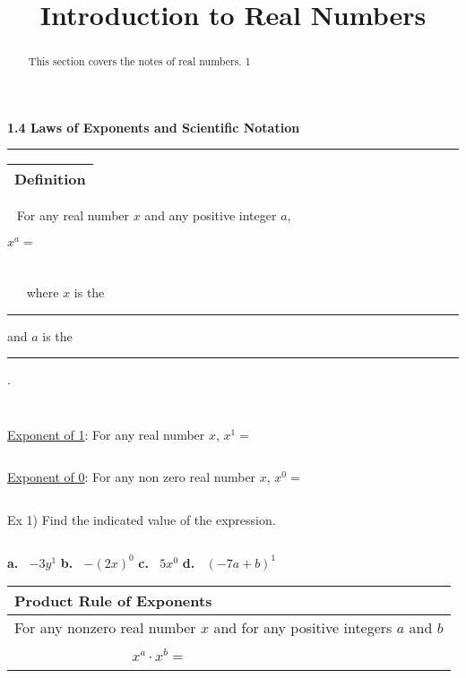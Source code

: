 \documentclass{ximera}
\title{Introduction to Real Numbers}
\begin{document}
\begin{abstract}
This section covers the notes of real numbers. 1
\end{abstract}

{\LARGE \textbf{1.4 Laws of Exponents and Scientific Notation}}

\noindent \rule{7.35in}{2pt}

\vspace{.2in}

\noindent \begin{tabular}{|c|} \hline Definition\\ \hline \end{tabular} $~~$ For any real number $x$ and any positive integer $a$,

\begin{center} {\LARGE $\displaystyle x^a=$} \end{center}

$~$

$~$

$~~~~~~~$where $x$ is the \rule{1in}{.5pt} and $a$ is the \rule{2in}{.5pt}.

$~$

$~$

\noindent \underline{Exponent of 1}: For any real number $x$, $x^1=$

$~$

\noindent \underline{Exponent of 0}: For any non zero real number $x$, $x^0=$

$~$

\noindent Ex 1) Find the indicated value of the expression.

$~$

\textbf{a.}$~~~~$$\displaystyle -3y^1$ \hspace{.75in} \textbf{b.}$~~~~$$\displaystyle -(2x)^0$ \hspace{.75in} \textbf{c.}$~~~~$$\displaystyle 5x^0$ \hspace{.75in} \textbf{d.}$~~~~$$\displaystyle (-7a+b)^1$

\vspace{1in}

\begin{center} \begin{tabular}{|l|}
\hline 
\textbf{Product Rule of Exponents}\\
\hline
For any nonzero real number $x$ and for any positive integers $a$ and $b$\\
$~$\\
$~~~~~~~~~~~~~~~~~~~~~~~~~~~~~~~~~~~~~${\Large$x^a\cdot x^b=~~~~$}\\
$~$\\
\hline
\end{tabular} \end{center}
\end{document}
